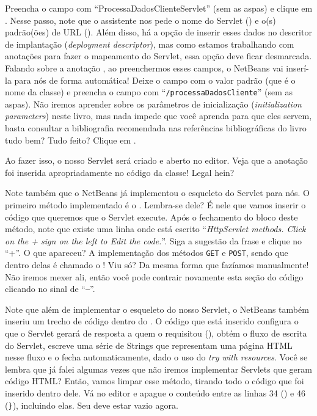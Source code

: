 Preencha o campo  com ``ProcessaDadosClienteServlet'' (sem as aspas) e clique em . Nesse passo, note que o assistente nos pede o nome do Servlet () e o(s) padrão(ões) de URL (). Além disso, há a opção de inserir esses dados no descritor de implantação (\textit{deployment descriptor}), mas como estamos trabalhando com anotações para fazer o mapeamento do Servlet, essa opção deve ficar desmarcada. Falando sobre a anotação , ao preenchermos esses campos, o NetBeans vai inserí-la para nós de forma automática! Deixe o campo  com o valor padrão (que é o nome da classe) e preencha o campo  com ``\texttt{/processaDadosCliente}'' (sem as aspas). Não iremos aprender sobre os parâmetros de inicialização (\textit{initialization parameters}) neste livro, mas nada impede que você aprenda para que eles servem, basta consultar a bibliografia recomendada nas referências bibliográficas do livro tudo bem? Tudo feito? Clique em .

Ao fazer isso, o nosso Servlet será criado e aberto no editor. Veja que a anotação  foi inserida apropriadamente no código da classe! Legal hein?

Note também que o NetBeans já implementou o esqueleto do Servlet para nós. O primeiro método implementado é o . Lembra-se dele? É nele que vamos inserir o código que queremos que o Servlet execute. Após o fechamento do bloco deste método, note que existe uma linha onde está escrito ``\textit{HttpServlet methods. Click on the + sign on the left to Edit the code.}''. Siga a sugestão da frase e clique no ``+''. O que apareceu? A implementação dos métodos \texttt{GET} e \texttt{POST}, sendo que dentro delas é chamado o ! Viu só? Da mesma forma que fazíamos manualmente! Não iremos mexer ali, então você pode contrair novamente esta seção do código clicando no sinal de ``\texttt{–}''.

Note que além de implementar o esqueleto do nosso Servlet, o NetBeans também inseriu um trecho de código dentro do . O código que está inserido configura o que o Servlet gerará de resposta a quem o requisitou \linebreak(), obtém o fluxo de escrita do Servlet, escreve uma série de Strings que representam uma página HTML nesse fluxo e o fecha automaticamente, dado o uso do \textit{try with resources}. Você se lembra que já falei algumas vezes que não iremos implementar Servlets que geram código HTML? Então, vamos limpar esse método, tirando todo o código que foi inserido dentro dele. Vá no editor e apague o conteúdo entre as linhas 34 () e 46 (\texttt{\}}), incluindo elas. Seu  deve estar vazio agora.

